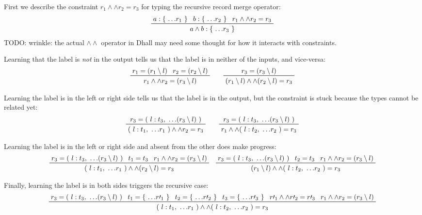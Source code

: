 \documentclass[11pt, twoside, reqno]{book}
\providecommand{\wedgeonwedge}{\land\land}
\begin{document}
First we describe the constraint $r_1 \wedgeonwedge r_2 = r_3$ for typing the recursive record merge operator:
\begin{displaymath}
\prftree{a : \{\ \dots\!r_1\ \}}{b : \{\ \dots\!r_2\ \}}{r_1 \wedgeonwedge r_2 = r_3}{a \land b : \{\ \dots\!r_3\ \}}
\end{displaymath}
TODO: wrinkle: the actual $\wedgeonwedge$ operator in Dhall may need some thought for how it interacts with constraints.

Learning that the label is \emph{not} in the output tells us that the label is in neither of the inputs, and vice-versa:
\begin{displaymath}
\prftree{r_1 = (r_1 \setminus l)}{r_2 = (r_2 \setminus l)}{r_1 \wedgeonwedge r_2 = (r_3 \setminus l)}
\qquad
\prftree{r_3 = (r_3 \setminus l)}{(r_1 \setminus l) \wedgeonwedge (r_2 \setminus l) = r_3}
\end{displaymath}

Learning the label is in the left or right side tells us that the label is in the output, but the constraint is stuck because the types cannot be related yet:
\begin{displaymath}
\prftree
  {r_3 = (\ l : t_3,\ \dots\!(r_3 \setminus l)\ )}
  {(\ l : t_1,\ \dots\!r_1\ ) \wedgeonwedge r_2 = r_3}
\qquad
\prftree
  {r_3 = (\ l : t_3,\ \dots\!(r_3 \setminus l)\ )}
  {r_1 \wedgeonwedge (\ l : t_2,\ \dots\!r_2\ ) = r_3}
\end{displaymath}

Learning the label is in the left or right side and absent from the other does make progress:
\begin{displaymath}
\prftree
  {r_3 = (\ l : t_3,\ \dots\!(r_3 \setminus l)\ )}
  {t_1 = t_3}
  {r_1 \wedgeonwedge r_2 = (r_3 \setminus l)}
  {(\ l : t_1,\ \dots\!r_1\ ) \wedgeonwedge (r_2 \setminus l) = r_3}
\quad
\prftree
  {r_3 = (\ l : t_3,\ \dots\!(r_3 \setminus l)\ )}
  {t_2 = t_3}
  {r_1 \wedgeonwedge r_2 = (r_3 \setminus l)}
  {(r_1 \setminus l) \wedgeonwedge (\ l : t_2,\ \dots\!r_2\ ) = r_3}
\end{displaymath}

Finally, learning the label is in both sides triggers the recursive case:
\begin{displaymath}
\prftree
  {r_3 = (\ l : t_3,\ \dots\!(r_3 \setminus l)\ )}
  {t_1 = \{\ \dots\!r\prime_1\ \}}
  {t_2 = \{\ \dots\!r\prime_2\ \}}  
  {t_3 = \{\ \dots\!r\prime_3\ \}}
  {r\prime_1 \wedgeonwedge r\prime_2 = r\prime_3}
  {r_1 \wedgeonwedge r_2 = (r_3 \setminus l)}
  {(\ l : t_1,\ \dots\!r_1\ ) \wedgeonwedge (\ l : t_2,\ \dots\!r_2\ ) = r_3}
\end{displaymath}
\end{document}
